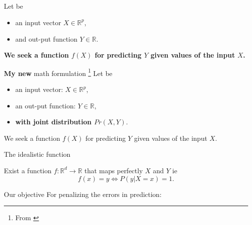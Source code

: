 \subsection{\subsectiontitle}
\begin{frame}{\subsectiontitle}
    Let be
    \begin{itemize}
        \item an input vector $X \in \mathbb{R}^p$, 
        \item and out-put function $Y \in \mathbb{R}$.
    \end{itemize}
    
    \textbf{ 
      We seek a function $f(X)$ for predicting $Y$ given values of the input $X$.
      }
\end{frame}
\begin{frame}{\textbf{My new} math formulation \footnote{ From \cite{HastieStatisticalLearing}}}
    Let be
    \begin{itemize}
        \item an input vector: $X \in \mathbb{R}^p$, 
        \item an out-put function: $Y \in \mathbb{R}$,
        \item  \textbf{with joint distribution $Pr(X,Y)$}.
    \end{itemize}
    
      We seek a function $f(X)$ for predicting $Y$ given values of the input $X$.

      \pause 
      \begin{theorem}{The idealistic function}
        
      \end{theorem}  
      Exist a function $f: \mathbb{R}^d \longrightarrow \mathbb{R}$ that maps perfectly $X$ and $Y$ ie 
      \begin{equation}
        f(x) = y 
        \Longleftrightarrow
        P(y |X=x) = 1.
      \end{equation}
\end{frame}
\begin{frame}{Our objective}
    For penalizing the errors in prediction: 

    
\end{frame}